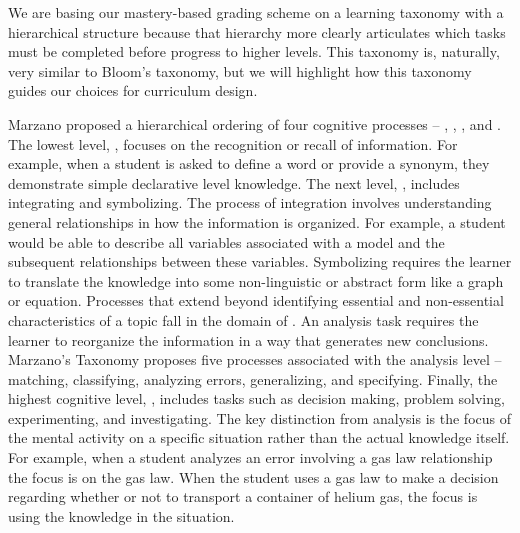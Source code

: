 \documentclass[10pt,letterpaper]{article}
\begin{document}
 We are basing our  mastery-based grading scheme on a learning taxonomy with a hierarchical structure because that hierarchy more clearly articulates which tasks must be completed before progress to higher levels. This taxonomy is, naturally, very similar to Bloom's taxonomy, but we will highlight how this taxonomy guides our choices for curriculum design.

Marzano proposed a hierarchical ordering of four cognitive processes -- \recall, \comprehension, \analysis, and \use  \citep{Marzano2006}. The lowest level, \recall, focuses on the recognition or recall of information. For example, when a student is asked to define a word or provide a synonym, they demonstrate simple declarative level knowledge. The next level, \comprehension, includes integrating and symbolizing. The process of integration involves understanding general relationships in how the information is organized. For example, a student would be able to describe all variables associated with a model and the subsequent relationships between these variables. Symbolizing requires the learner to translate the knowledge into some non-linguistic or abstract form like a graph or equation. Processes that extend beyond identifying essential and non-essential characteristics of a topic fall in the domain of \analysis. An analysis task requires the learner to reorganize the information in a way that generates new conclusions. Marzano's Taxonomy proposes five processes associated with the analysis level -- matching, classifying, analyzing errors, generalizing, and specifying. Finally, the highest cognitive level, \use, includes tasks such as decision making, problem solving, experimenting, and investigating. The key distinction from analysis is the focus of the mental activity on a specific situation rather than the actual knowledge itself. For example, when a student analyzes an error involving a gas law relationship the focus is on the gas law. When the student uses a gas law to make a decision regarding whether or not to transport a container of helium gas, the focus is using the knowledge in the situation. 

\end{document}
